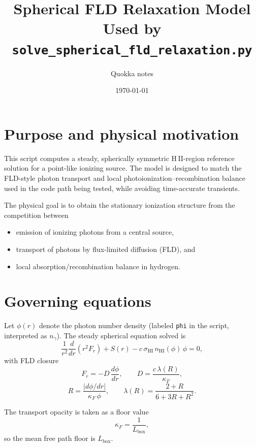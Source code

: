 \documentclass[11pt]{article}
\title{Spherical FLD Relaxation Model Used by \texttt{solve\_spherical\_fld\_relaxation.py}}
\author{Quokka notes}
\date{\today}
\begin{document}
\maketitle

\section{Purpose and physical motivation}
This script computes a steady, spherically symmetric H\,II-region reference solution for a point-like ionizing source. The model is designed to match the FLD-style photon transport and local photoionization--recombination balance used in the code path being tested, while avoiding time-accurate transients.

The physical goal is to obtain the stationary ionization structure from the competition between
\begin{itemize}
\item emission of ionizing photons from a central source,
\item transport of photons by flux-limited diffusion (FLD), and
\item local absorption/recombination balance in hydrogen.
\end{itemize}

\section{Governing equations}
Let $\phi(r)$ denote the photon number density (labeled \texttt{phi} in the script, interpreted as $n_\gamma$). The steady spherical equation solved is
\begin{equation}
\frac{1}{r^2}\frac{d}{dr}\!\left(r^2 F_r\right) + S(r) - c\,\sigma_{\mathrm{HI}}\,n_{\mathrm{HI}}(\phi)\,\phi = 0,
\label{eq:steady}
\end{equation}
with FLD closure
\begin{equation}
F_r = -D\,\frac{d\phi}{dr}, \qquad D = \frac{c\,\lambda(R)}{\kappa_F},
\end{equation}
\begin{equation}
R = \frac{\left|d\phi/dr\right|}{\kappa_F\,\phi}, \qquad
\lambda(R)=\frac{2+R}{6+3R+R^2}.
\end{equation}

The transport opacity is taken as a floor value
\begin{equation}
\kappa_F = \frac{1}{L_{\mathrm{box}}},
\end{equation}
so the mean free path floor is $L_{\mathrm{box}}$.
\end{document}
